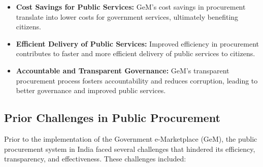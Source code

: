 \begin{itemize}
    \item \textbf{Cost Savings for Public Services:} GeM's cost savings in procurement translate into lower costs for government services, ultimately benefiting citizens.
    
    \item \textbf{Efficient Delivery of Public Services:} Improved efficiency in procurement contributes to faster and more efficient delivery of public services to citizens.
    
    \item \textbf{Accountable and Transparent Governance:} GeM's transparent procurement process fosters accountability and reduces corruption, leading to better governance and improved public services.
\end{itemize}

\subsection{Prior Challenges in Public Procurement}

Prior to the implementation of the Government e-Marketplace (GeM), the public procurement system in India faced several challenges that hindered its efficiency, transparency, and effectiveness. These challenges included:

